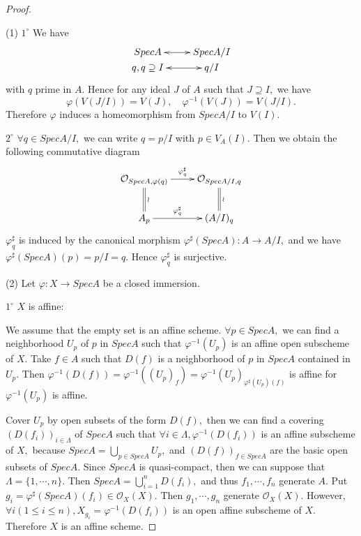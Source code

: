 \begin{proof}\
\enum
\item[(1)]$\mathit{1^{\circ}}$ We have
\[ \xymatrix@R=0em{
   SpecA \ar@{<->}[r] & SpecA/I               \\
   {q,q\supseteq I} \ar@{<->}[r] & q/I }  \]
with $q$ prime in $A.$ Hence for any ideal $J$ of $A$ such that
$J\supseteq I,$ we have $$\varphi(V(J/I))=V(J),\quad
\varphi^{-1}(V(J))=V(J/I).$$ Therefore $\varphi$ induces a
homeomorphism from $SpecA/I$ to $V(I).$

$\mathit{2^{\circ}}$ $\forall q\in SpecA/I,$ we can write $q=p/I$
with $p\in V_A(I).$ Then we obtain the following commutative diagram
\[ \xymatrix{
   {\mathcal {O}_{SpecA,\varphi(q)}} \ar[r]^-{\varphi^{\sharp}_q}
   \ar@{=}[d]^-{\wr} & {\mathcal {O}_{SpecA/I,q}} \ar@{=}[d]^-{\wr}\\
   A_p \ar[r]^-{\varphi^{\sharp}_q} & {(A/I)_q} }  \]
$\varphi^{\sharp}_q$ is induced by the canonical morphism
$\varphi^{\sharp}(SpecA):A\rightarrow A/I,$ and we have
$\varphi^{\sharp}(SpecA)(p)=p/I=q.$ Hence $\varphi^{\sharp}_q$ is
surjective.
\item[(2)]Let $\varphi:X\rightarrow SpecA$ be a closed immersion.

$\mathit{1^{\circ}}$ $X$ is affine:

We assume that the empty set is an affine scheme. $\forall p\in
SpecA,$ we can find a neighborhood $U_p$ of $p$ in $SpecA$ such that
$\varphi^{-1}(U_p)$ is an affine open subscheme of $X.$ Take $f\in
A$ such that $D(f)$ is a neighborhood of $p$ in $SpecA$ contained in
$U_p.$ Then
$\varphi^{-1}(D(f))=\varphi^{-1}((U_p)_f)=\varphi^{-1}(U_p)_{\varphi^{\sharp}(U_p)(f)}$
is affine for $\varphi^{-1}(U_p)$ is affine.

Cover $U_p$ by open subsets of the form $D(f),$ then we can find a
covering $(D(f_i))_{i\in\Lambda}$ of $SpecA$ such that $\forall
i\in\Lambda, \varphi^{-1}(D(f_i))$ is an affine subscheme of $X,$
because $SpecA=\bigcup\limits_{p\in SpecA}U_p,$ and $(D(f))_{f\in
SpecA}$ are the basic open subsets of $SpecA.$ Since $SpecA$ is
quasi-compact, then we can suppose that $\Lambda=\{1,\cdots,n\}.$
Then $SpecA=\bigcup\limits_{i=1}^nD(f_i),$ and thus $f_1,\cdots,f_n$
generate $A.$ Put $g_i=\varphi^{\sharp}(SpecA)(f_i)\in \mathcal
{O}_X(X).$ Then $g_1,\cdots,g_n$ generate $\mathcal {O}_X(X).$
However, $\forall i(1\leqslant i\leqslant n),
X_{g_i}=\varphi^{-1}(D(f_i))$ is an open affine subscheme of $X.$
Therefore $X$ is an affine scheme.


\end{proof}
